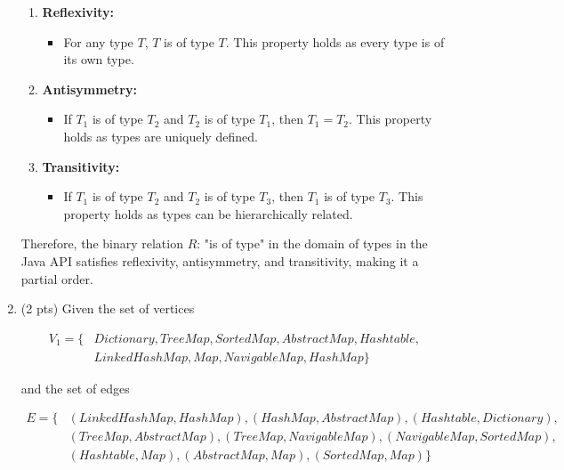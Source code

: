 \documentclass[12pt]{article}
\begin{document}
\begin{spacing}{1.5}
\begin{enumerate}
		      \begin{enumerate}
		      	\item \textbf{Reflexivity:}
		      	      \begin{itemize}
		      	      	\item For any type $T$, $T$ is of type $T$. This property holds as every type is of its own type.
		      	      \end{itemize}
		      	      		      	      
		      	\item \textbf{Antisymmetry:}
		      	      \begin{itemize}
		      	      	\item If $T_1$ is of type $T_2$ and $T_2$ is of type $T_1$, then $T_1 = T_2$. This property holds as types are uniquely defined.
		      	      \end{itemize}
		      	      		      	      
		      	\item \textbf{Transitivity:}
		      	      \begin{itemize}
		      	      	\item If $T_1$ is of type $T_2$ and $T_2$ is of type $T_3$, then $T_1$ is of type $T_3$. This property holds as types can be hierarchically related.
		      	      \end{itemize}
		      \end{enumerate}
		      		      
		      Therefore, the binary relation $R$: "is of type" in the domain of types in the Java API satisfies reflexivity, antisymmetry, and transitivity, making it a partial order. 
		      		      
		\item (2 pts) Given the set of vertices
		      		      
		      \begin{align*}
		      	V_1= \{ & Dictionary, TreeMap, SortedMap, AbstractMap, Hashtable, \\
		      	        & LinkedHashMap, Map, NavigableMap, HashMap\}             
		      \end{align*}
		      		              
		      and the set of edges
		      		      
		      \begin{align*}
		      	E = \{ & (LinkedHashMap, HashMap), (HashMap, AbstractMap), (Hashtable, Dictionary),  \\
		      	       & (TreeMap, AbstractMap), (TreeMap, NavigableMap), (NavigableMap, SortedMap), \\
		      	       & (Hashtable, Map), (AbstractMap, Map), (SortedMap, Map) \}                   
		      \end{align*}
		      		      

\end{enumerate}
\end{spacing}
\end{document}
